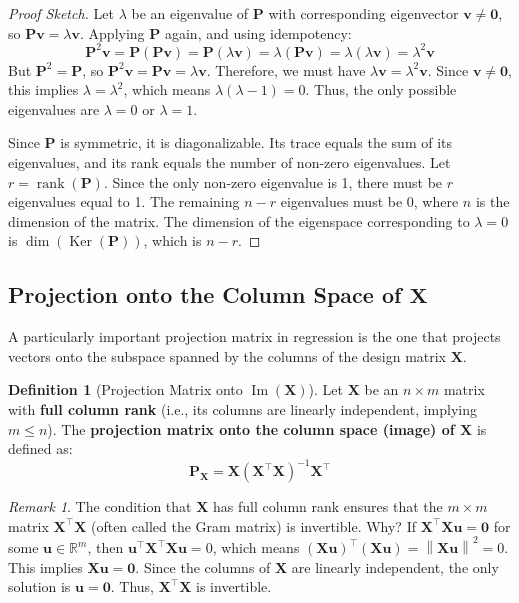 \documentclass[11pt, a4paper]{article}
\DeclareMathOperator{\rank}{\mathrm{rank}}       %
\DeclareMathOperator{\Image}{\mathrm{Im}}        %
\DeclareMathOperator{\Ker}{\mathrm{Ker}}         %
\theoremstyle{definition}
\newtheorem{definition}[theorem]{Definition}
\theoremstyle{remark}
\newtheorem{remark}[theorem]{Remark}
\newcommand{\RR}{\mathbb{R}}             %
\newcommand{\mat}[1]{\mathbf{#1}}       %
\newcommand{\vect}[1]{\bm{#1}}          %
\newcommand{\transpose}{^{\top}}        %
\newcommand{\norm}[1]{\left\| #1 \right\|} %
\begin{document}
\begin{proof}[Proof Sketch]
Let $\lambda$ be an eigenvalue of $\mat{P}$ with corresponding eigenvector $\vect{v} \neq \vect{0}$, so $\mat{P}\vect{v} = \lambda\vect{v}$.
Applying $\mat{P}$ again, and using idempotency:
\[ \mat{P}^2 \vect{v} = \mat{P}(\mat{P}\vect{v}) = \mat{P}(\lambda\vect{v}) = \lambda(\mat{P}\vect{v}) = \lambda(\lambda\vect{v}) = \lambda^2 \vect{v} \]
But $\mat{P}^2 = \mat{P}$, so $\mat{P}^2 \vect{v} = \mat{P}\vect{v} = \lambda \vect{v}$.
Therefore, we must have $\lambda \vect{v} = \lambda^2 \vect{v}$. Since $\vect{v} \neq \vect{0}$, this implies $\lambda = \lambda^2$, which means $\lambda(\lambda - 1) = 0$. Thus, the only possible eigenvalues are $\lambda = 0$ or $\lambda = 1$.

Since $\mat{P}$ is symmetric, it is diagonalizable. Its trace equals the sum of its eigenvalues, and its rank equals the number of non-zero eigenvalues. Let $r = \rank(\mat{P})$. Since the only non-zero eigenvalue is 1, there must be $r$ eigenvalues equal to 1. The remaining $n-r$ eigenvalues must be 0, where $n$ is the dimension of the matrix. The dimension of the eigenspace corresponding to $\lambda=0$ is $\dim(\Ker(\mat{P}))$, which is $n-r$.
\end{proof}

\subsection{Projection onto the Column Space of \texorpdfstring{$\mat{X}$}{X}}

A particularly important projection matrix in regression is the one that projects vectors onto the subspace spanned by the columns of the design matrix $\mat{X}$.

\begin{definition}[Projection Matrix onto $\Image(\mat{X})$]
Let $\mat{X}$ be an $n \times m$ matrix with \textbf{full column rank} (i.e., its columns are linearly independent, implying $m \leq n$). The \textbf{projection matrix onto the column space (image) of $\mat{X}$} is defined as:
\[ \mat{P}_{\mat{X}} = \mat{X} (\mat{X}\transpose \mat{X})^{-1} \mat{X}\transpose \]
\end{definition}

\begin{remark}
The condition that $\mat{X}$ has full column rank ensures that the $m \times m$ matrix $\mat{X}\transpose \mat{X}$ (often called the Gram matrix) is invertible. Why? If $\mat{X}\transpose \mat{X} \vect{u} = \vect{0}$ for some $\vect{u} \in \RR^m$, then $\vect{u}\transpose \mat{X}\transpose \mat{X} \vect{u} = 0$, which means $(\mat{X}\vect{u})\transpose (\mat{X}\vect{u}) = \norm{\mat{X}\vect{u}}^2 = 0$. This implies $\mat{X}\vect{u} = \vect{0}$. Since the columns of $\mat{X}$ are linearly independent, the only solution is $\vect{u} = \vect{0}$. Thus, $\mat{X}\transpose \mat{X}$ is invertible.
\end{remark}
\end{document}
